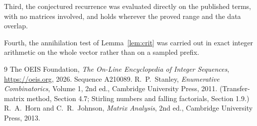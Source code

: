 \documentclass[11pt,a4paper]{article}
\theoremstyle{plain}
\theoremstyle{definition}
\begin{document}
Third, the conjectured recurrence was evaluated directly on the published terms, with no
matrices involved, and holds wherever the proved range and the data overlap.

Fourth, the annihilation test of Lemma~\ref{lem:crit} was carried out in exact integer
arithmetic on the whole vector rather than on a sampled prefix.

\begin{thebibliography}{9}
 The OEIS Foundation, \emph{The On-Line Encyclopedia of Integer
Sequences}, \url{https://oeis.org}, 2026. Sequence A210089.
 R.~P.~Stanley, \emph{Enumerative Combinatorics}, Volume 1, 2nd ed.,
Cambridge University Press, 2011. (Transfer-matrix method, Section 4.7; Stirling numbers and
falling factorials, Section 1.9.)
 R.~A.~Horn and C.~R.~Johnson, \emph{Matrix Analysis}, 2nd ed., Cambridge
University Press, 2013.
\end{thebibliography}
\end{document}
